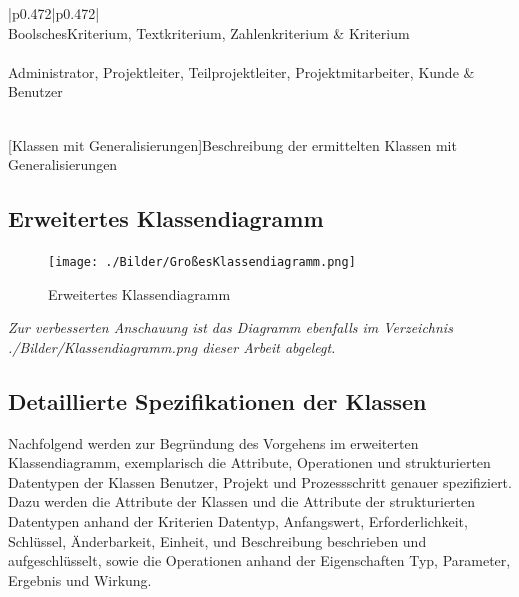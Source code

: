 \begin{xltabular}{\textwidth}{|p{0.472\textwidth}|p{0.472\textwidth}|}
    \hline
    \\\hline\hline
    BoolschesKriterium, Textkriterium, Zahlenkriterium & Kriterium \\\hline
    \\\hline\hline
    Administrator, Projektleiter, Teilprojektleiter, Projektmitarbeiter, Kunde & Benutzer \\\hline
    \\\hline
\end{xltabular}
[Klassen mit Generalisierungen]{Beschreibung der ermittelten Klassen mit Generalisierungen}
\newpage
\subsection{Erweitertes Klassendiagramm}
\begin{figure}[h!]
    \centering
    \texttt{[image: ./Bilder/GroßesKlassendiagramm.png]}
    \caption[Erweitertes Klassendiagramm]{Erweitertes Klassendiagramm}
    \label{fig:Klassendiagramm}
\end{figure}
\emph{Zur verbesserten Anschauung ist das Diagramm ebenfalls im Verzeichnis ./Bilder/Klassendiagramm.png dieser Arbeit abgelegt.}
\newpage
\subsection{Detaillierte Spezifikationen der Klassen}
Nachfolgend werden zur Begründung des Vorgehens im erweiterten Klassendiagramm, exemplarisch die Attribute, Operationen und strukturierten Datentypen der Klassen Benutzer, Projekt und Prozessschritt genauer spezifiziert. Dazu werden die Attribute der Klassen und die Attribute der strukturierten Datentypen anhand der Kriterien \glqq{}Datentyp\grqq{}, \glqq{}Anfangswert\grqq{}, \glqq{}Erforderlichkeit\grqq{}, \glqq{}Schlüssel\grqq{}, \glqq{}Änderbarkeit\grqq{}, \glqq{}Einheit\grqq{}, und \glqq{}Beschreibung\grqq{} beschrieben und aufgeschlüsselt, sowie die Operationen anhand der Eigenschaften \glqq{}Typ\grqq{}, \glqq{}Parameter\grqq{}, \glqq{}Ergebnis\grqq{} und \glqq{}Wirkung\grqq{}. 

